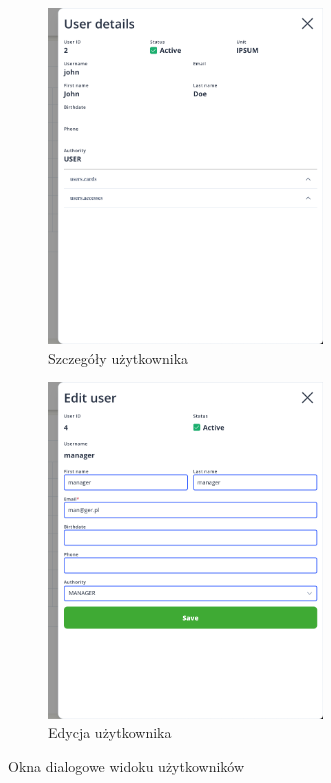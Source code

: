\begin{figure}[H]
    \centering
    \begin{subfigure}[b]{0.49\textwidth}
        \centering
        \includegraphics[width=0.8\textwidth, frame]{graf/front/userDetails.png}
        \caption{Szczegóły użytkownika}
    \end{subfigure}
    \begin{subfigure}[b]{0.49\textwidth}
        \centering
        \includegraphics[width=0.8\textwidth, frame]{graf/front/editUser.png}
        \caption{Edycja użytkownika}
    \end{subfigure}
    \caption{Okna dialogowe widoku użytkowników}
    \label{fig:userDialogs}
\end{figure}

